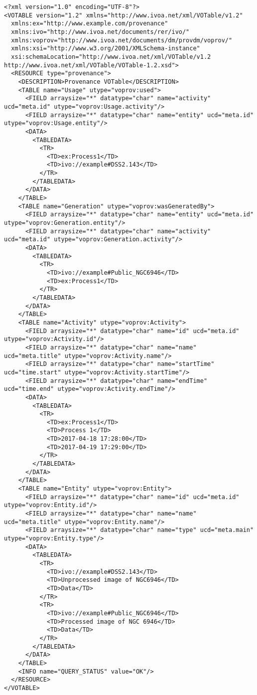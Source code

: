 \begin{verbatim}
<?xml version="1.0" encoding="UTF-8"?>
<VOTABLE version="1.2" xmlns="http://www.ivoa.net/xml/VOTable/v1.2" 
  xmlns:ex="http://www.example.com/provenance" 
  xmlns:ivo="http://www.ivoa.net/documents/rer/ivo/"
  xmlns:voprov="http://www.ivoa.net/documents/dm/provdm/voprov/" 
  xmlns:xsi="http://www.w3.org/2001/XMLSchema-instance" 
  xsi:schemaLocation="http://www.ivoa.net/xml/VOTable/v1.2 http://www.ivoa.net/xml/VOTable/VOTable-1.2.xsd">
  <RESOURCE type="provenance">
    <DESCRIPTION>Provenance VOTable</DESCRIPTION>
    <TABLE name="Usage" utype="voprov:used">
      <FIELD arraysize="*" datatype="char" name="activity" ucd="meta.id" utype="voprov:Usage.activity"/>
      <FIELD arraysize="*" datatype="char" name="entity" ucd="meta.id" utype="voprov:Usage.entity"/>
      <DATA>
        <TABLEDATA>
          <TR>
            <TD>ex:Process1</TD>
            <TD>ivo://example#DSS2.143</TD>
          </TR>
        </TABLEDATA>
      </DATA>
    </TABLE>
    <TABLE name="Generation" utype="voprov:wasGeneratedBy">
      <FIELD arraysize="*" datatype="char" name="entity" ucd="meta.id" utype="voprov:Generation.entity"/>
      <FIELD arraysize="*" datatype="char" name="activity" ucd="meta.id" utype="voprov:Generation.activity"/>
      <DATA>
        <TABLEDATA>
          <TR>
            <TD>ivo://example#Public_NGC6946</TD>
            <TD>ex:Process1</TD>
          </TR>
        </TABLEDATA>
      </DATA>
    </TABLE>
    <TABLE name="Activity" utype="voprov:Activity">
      <FIELD arraysize="*" datatype="char" name="id" ucd="meta.id" utype="voprov:Activity.id"/>
      <FIELD arraysize="*" datatype="char" name="name" ucd="meta.title" utype="voprov:Activity.name"/>
      <FIELD arraysize="*" datatype="char" name="startTime" ucd="time.start" utype="voprov:Activity.startTime"/>
      <FIELD arraysize="*" datatype="char" name="endTime" ucd="time.end" utype="voprov:Activity.endTime"/>
      <DATA>
        <TABLEDATA>
          <TR>
            <TD>ex:Process1</TD>
            <TD>Process 1</TD>
            <TD>2017-04-18 17:28:00</TD>
            <TD>2017-04-19 17:29:00</TD>
          </TR>
        </TABLEDATA>
      </DATA>
    </TABLE>
    <TABLE name="Entity" utype="voprov:Entity">
      <FIELD arraysize="*" datatype="char" name="id" ucd="meta.id" utype="voprov:Entity.id"/>
      <FIELD arraysize="*" datatype="char" name="name" ucd="meta.title" utype="voprov:Entity.name"/>
      <FIELD arraysize="*" datatype="char" name="type" ucd="meta.main" utype="voprov:Entity.type"/>
      <DATA>
        <TABLEDATA>
          <TR>
            <TD>ivo://example#DSS2.143</TD>
            <TD>Unprocessed image of NGC6946</TD>
            <TD>Data</TD>
          </TR>
          <TR>
            <TD>ivo://example#Public_NGC6946</TD>
            <TD>Processed image of NGC 6946</TD>
            <TD>Data</TD>
          </TR>
        </TABLEDATA>
      </DATA>
    </TABLE>
    <INFO name="QUERY_STATUS" value="OK"/>
  </RESOURCE>
</VOTABLE>
\end{verbatim}

